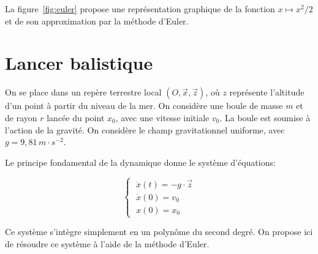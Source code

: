 \documentclass[twoside, symmetric]{tufte-handout}
\begin{document}
La figure~\ref{fig:euler} propose une représentation graphique de la fonction $x
\mapsto x^2/2$ et de son approximation par la méthode d'Euler.

\section{Lancer balistique}

On se place dans un repère terrestre local $\left( O, \vec{x}, \vec{z} \right)$,
où $z$ représente l'altitude d'un point à partir du niveau de la mer. On
considère une boule de masse $m$ et de rayon $r$ lancée du point $x_0$, avec une
vitesse initiale $v_0$. La boule est soumise à l'action de la gravité. On
considère le champ gravitationnel uniforme, avec $g = 9,81\, m\cdot s^{-2}$.

Le principe fondamental de la dynamique donne le système d'équations:

\begin{equation}
    \begin{cases}
        \;\ddot{x}(t) =  -g\cdot\vec{z}\\
        \;\dot{x}(0) =  v_0\\
        \;x(0) =  x_0
    \end{cases}
    \label{eqn:ballistic}
\end{equation}

Ce système s'intègre simplement en un polynôme du second degré. On propose ici
de résoudre ce système à l'aide de la méthode d'Euler.
\end{document}
